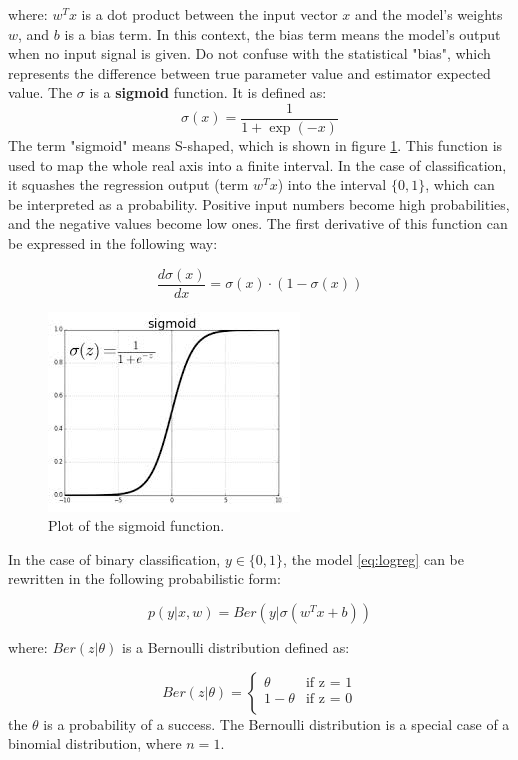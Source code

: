 where: $w^{T}x$ is a dot product between the input vector $x$ and the model's weights $w$, and $b$ is a bias term. In this context, the bias term means the model's output when no input signal is given. Do not confuse with the statistical "bias", which represents the difference between true parameter value and estimator expected value. The $\sigma$ is a \textbf{sigmoid} function. It is defined as: 
\begin{equation}
\label{eg:sigmoid}
    \sigma(x) = \frac{1}{1+\exp(-x)}
\end{equation}
The term "sigmoid" means S-shaped, which is shown in figure \ref{fig:sigmoid}. This function is used to map the whole real axis into a finite interval. In the case of classification, it squashes the regression output (term $w^{T}x$) into the interval $\{0,1\}$, which can be interpreted as a probability. Positive input numbers become high probabilities, and the negative values become low ones. 
The first derivative of this function can be expressed in the following way:

\begin{equation}
    \frac{d\sigma(x)}{dx} = \sigma(x)\cdot(1-\sigma(x))
\end{equation}


\begin{figure}[h]
\centering
\includegraphics[scale=0.6]{figures/sigmoid.jpg}
\caption{Plot of the sigmoid function.
\label{fig:sigmoid}}
\end{figure}


In the case of binary classification, $y \in \{0,1\}$, the model \ref{eq:logreg} can be rewritten in the following probabilistic form:

\begin{equation}
p(y|x,w) = Ber(y|\sigma(w^{T}x + b))
\end{equation}

where: $Ber(z|\theta)$ is a Bernoulli  distribution defined as:

\begin{equation}
    Ber(z|\theta) =  \left\{ \begin{array}{ll}
\theta & \textrm{if z = 1}\\
1-\theta & \textrm{if z = 0}\\
\end{array} \right.
\end{equation}
the $\theta$ is a probability of a success. The Bernoulli distribution is a special case of a binomial distribution, where $n=1$. 

